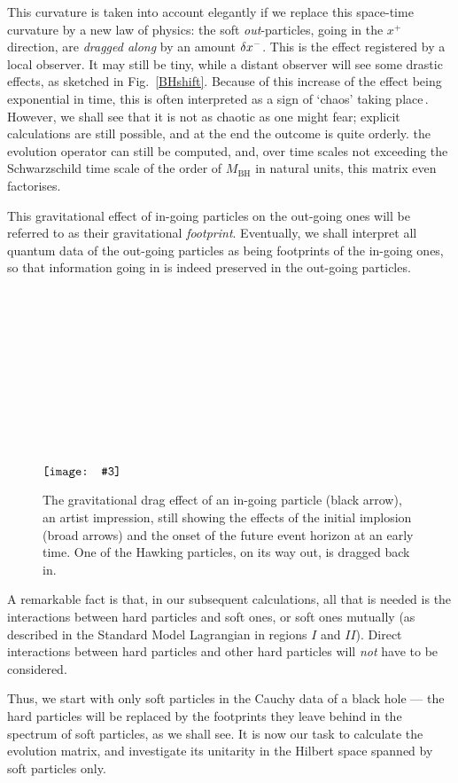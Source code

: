 \documentclass[12pt]{article}
\def\lowerwidthfig#1#2#3{\(\raise-#1\hbox{\texttt{[image: \#3]}}\)}
\def\BH{{\mathrm{BH}}}\def\Pl{{\mathrm{Pl}}}\def\inn{{\mathrm{in}}} \def\outt{{\mathrm{out}}}
\begin{document}
This curvature is taken into account elegantly if we replace this space-time curvature by a new law of physics: the soft \emph{out}-particles, going in the \(x^+\) direction, are \emph{dragged along} by an amount \(\delta x^-\).
This is the effect registered by a local observer. It may still be tiny, while a distant observer will see some drastic effects, as sketched in Fig.~\ref{BHshift}. Because of this increase of the effect being exponential in time, this is often interpreted as a sign of `chaos' taking place\,\cite{ER=EPR}. However, we shall see that it is not as chaotic as one might fear; explicit calculations are still possible, and at the end the outcome is quite orderly. the evolution operator can still be computed, and, over time scales not exceeding the Schwarzschild time scale of the order of \(M_\BH\) in natural units, this matrix even factorises.

This gravitational effect of in-going particles on the out-going ones will be referred to as their gravitational \emph{footprint}. Eventually, we shall interpret all quantum data of the out-going particles as being footprints of the in-going ones, so that information going in is indeed preserved in the out-going particles.

\begin{figure} \qqquad\qqquad\qqquad
\lowerwidthfig{150pt}{150pt}{BH_timecoord2.eps} \quad \begin{caption}
{ \small The gravitational drag effect of an in-going particle (black arrow), an artist impression, still showing the effects of the initial implosion (broad arrows) and the onset of the future event horizon at an early time. One of the Hawking particles, on its way out, is dragged back in.}
 \end{caption} \end{figure}

A remarkable fact is that, in our subsequent calculations, all that is needed is the interactions between hard particles and soft ones, or soft ones mutually (as described in the Standard Model Lagrangian in regions \(I\) and \(II\)).  Direct interactions between hard particles and other hard particles will \emph{not} have to be considered.

Thus, we start with only soft particles in the Cauchy data of a black hole --- the hard particles will be replaced by the footprints they leave behind in the spectrum of soft particles, as we shall see. It is now our task to calculate the evolution matrix, and investigate its unitarity in the Hilbert space spanned by soft particles only.
\end{document}
